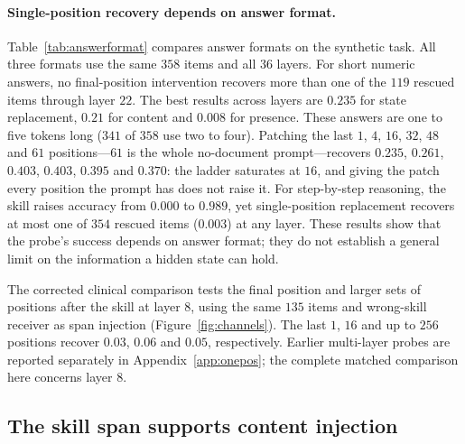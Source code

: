 \documentclass{article}
\begin{document}
\paragraph{Single-position recovery depends on answer format.}
\label{sec:onepos}
Table~\ref{tab:answerformat} compares answer formats on the synthetic task.
All three formats use the same $358$ items and all $36$ layers. For short
numeric answers, no final-position intervention recovers more than one of the
$119$ rescued items through layer $22$. The best results across layers are
$0.235$ for state replacement, $0.21$ for content and $0.008$ for presence.
These answers are one to five tokens long ($341$ of $358$ use two to four).
Patching the last $1$, $4$, $16$, $32$, $48$ and $61$ positions---$61$ is the
whole no-document prompt---recovers $0.235$, $0.261$, $0.403$, $0.403$, $0.395$
and $0.370$: the ladder saturates at $16$, and giving the patch every position
the prompt has does not raise it. For step-by-step reasoning, the skill raises accuracy from $0.000$ to
$0.989$, yet single-position replacement recovers at most one of $354$ rescued
items ($0.003$) at any layer.
These results show that the probe's success depends on answer format; they do
not establish a general limit on the information a hidden state can hold.

\begin{table}[t]
\caption{Final-position state replacement across answer formats, Qwen3-8B.
All formats use the same $358$ items and the same skill, with every layer
($0$--$35$) tested. Recovery is the best state-replacement result over layers
on each format's rescued items. The identity intervention reproduces the
unpatched output on every item and layer.}
\label{tab:answerformat}
\centering\small

\end{table}

The corrected clinical comparison tests the final position and larger sets
of positions after the skill at layer $8$, using the same $135$ items and
wrong-skill receiver as span injection (Figure~\ref{fig:channels}). The last
$1$, $16$ and up to $256$ positions recover $0.03$, $0.06$ and $0.05$,
respectively. Earlier multi-layer probes
are reported separately in Appendix~\ref{app:onepos}; the complete matched
comparison here concerns layer $8$.

\subsection{The skill span supports content injection}
\label{sec:battery}
\end{document}
